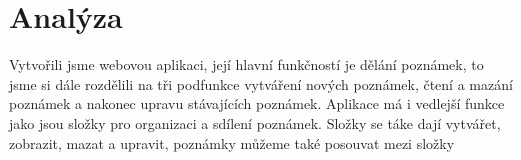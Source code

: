 \section{Analýza}
Vytvořili jsme webovou aplikaci, její hlavní funkčností je dělání poznámek, to jsme si dále rozdělili na tři podfunkce vytváření nových poznámek, čtení a mazání poznámek a nakonec upravu stávajících poznámek. Aplikace má i vedlejší funkce jako jsou složky pro organizaci a sdílení poznámek. Složky se táke dají vytvářet, zobrazit, mazat a upravit, poznámky můžeme také posouvat mezi složky
